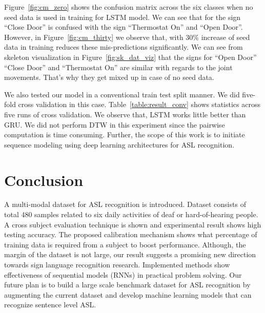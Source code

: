 \documentclass[10pt,twocolumn,letterpaper]{article}
\begin{document}
Figure~\ref{fig:cm_zero} shows the 
 confusion matrix  across the six classes when no seed data is used in training for LSTM model. We can see that for the 
 sign ``Close Door'' is confused with the sign ``Thermostat On'' and ``Open Door''. However, in Figure~\ref{fig:cm_thirty} we observe that, with 30\% increase of seed data in training reduces these mis-predictions significantly. We can see from skeleton visualization in Figure~\ref{fig:sk_dat_viz} that the signs for ``Open Door''
 ``Close Door'' and ``Thermostat On'' are  similar with regards to the joint movements. That's why they get mixed up in case of no seed data. 
 
 
We also tested our model in a  conventional train test split manner. 
We did five-fold cross validation in this case. Table~\ref{table:result_conv} shows statistics across five runs of cross validation. We observe that, LSTM works little better than GRU.
We did not perform DTW in this experiment since the pairwise computation is time consuming. Further, the scope of  this work is to initiate sequence modeling using deep learning architectures for ASL recognition.

 
\section{Conclusion}
A multi-modal dataset for ASL recognition is introduced. Dataset consists of total 480 samples related to six daily activities of deaf or hard-of-hearing people. A cross subject evaluation technique is shown and experimental result shows high testing accuracy. The proposed calibration mechanism shows what percentage of training data is required from a subject to boost performance. Although, the margin of the dataset is not large, our result suggests a promising new direction towards sign language recognition research. Implemented methods show effectiveness of sequential models (RNNs) in practical problem solving. Our future plan is to build a large scale benchmark dataset for ASL recognition by augmenting the current dataset and develop machine learning models that can recognize sentence level ASL.




{\small


}
\end{document}
